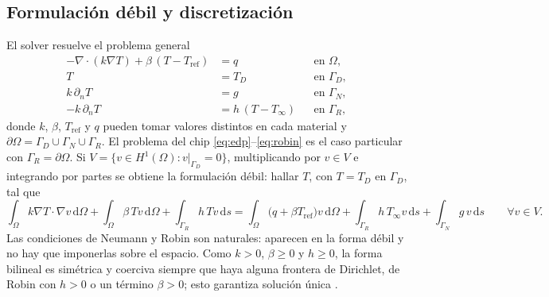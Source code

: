 \documentclass[preprint,11pt,sort&compress]{elsarticle}
\newcommand{\dd}{\,\mathrm{d}}
\begin{document}

\subsection{Formulación débil y discretización}

El solver resuelve el problema general
\begin{equation}
\begin{aligned}
  -\nabla\cdot(k\nabla T)+\beta\,(T-T_{\mathrm{ref}}) &= q && \text{en }\Omega,\\
  T &= T_D && \text{en }\Gamma_D,\\
  k\,\partial_n T &= g && \text{en }\Gamma_N,\\
  -k\,\partial_n T &= h\,(T-T_\infty) && \text{en }\Gamma_R,
\end{aligned}
\label{eq:general}
\end{equation}
donde $k$, $\beta$, $T_{\mathrm{ref}}$ y $q$ pueden tomar valores distintos en cada
material y $\partial\Omega=\Gamma_D\cup\Gamma_N\cup\Gamma_R$. El problema del chip
\eqref{eq:edp}--\eqref{eq:robin} es el caso particular con $\Gamma_R=\partial\Omega$. Si
$V=\{v\in H^1(\Omega):v|_{\Gamma_D}=0\}$, multiplicando por $v\in V$ e integrando por
partes se obtiene la formulación débil: hallar $T$, con $T=T_D$ en $\Gamma_D$, tal que
\begin{equation}
  \int_\Omega k\nabla T\cdot\nabla v\dd\Omega
  +\int_\Omega \beta\,T v\dd\Omega
  +\int_{\Gamma_R} h\,T v\dd s
  =\int_\Omega \bigl(q+\beta T_{\mathrm{ref}}\bigr) v\dd\Omega
  +\int_{\Gamma_R} h\,T_\infty v\dd s
  +\int_{\Gamma_N} g\,v\dd s
  \qquad\forall v\in V.
  \label{eq:debil}
\end{equation}
Las condiciones de Neumann y Robin son naturales: aparecen en la forma débil y no hay que
imponerlas sobre el espacio. Como $k>0$, $\beta\ge0$ y $h\ge0$, la forma bilineal es
simétrica y coerciva siempre que haya alguna frontera de Dirichlet, de Robin con $h>0$ o un
término $\beta>0$; esto garantiza solución única \cite{larson2013fem}.
\end{document}
